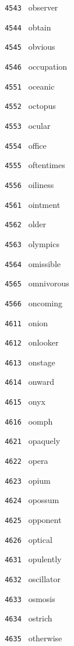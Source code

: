 \documentclass[11pt]{article}
\begin{document}
\begin{multicols}{6}
\noindent \texttt{ 4543 } observer  \par
\noindent \texttt{ 4544 } obtain  \par
\noindent \texttt{ 4545 } obvious  \par
\noindent \texttt{ 4546 } occupation  \par
\noindent \texttt{ 4551 } oceanic  \par
\noindent \texttt{ 4552 } octopus  \par
\noindent \texttt{ 4553 } ocular  \par
\noindent \texttt{ 4554 } office  \par
\noindent \texttt{ 4555 } oftentimes  \par
\noindent \texttt{ 4556 } oiliness  \par
\noindent \texttt{ 4561 } ointment  \par
\noindent \texttt{ 4562 } older  \par
\noindent \texttt{ 4563 } olympics  \par
\noindent \texttt{ 4564 } omissible  \par
\noindent \texttt{ 4565 } omnivorous  \par
\noindent \texttt{ 4566 } oncoming  \par
\noindent \texttt{ 4611 } onion  \par
\noindent \texttt{ 4612 } onlooker  \par
\noindent \texttt{ 4613 } onstage  \par
\noindent \texttt{ 4614 } onward  \par
\noindent \texttt{ 4615 } onyx  \par
\noindent \texttt{ 4616 } oomph  \par
\noindent \texttt{ 4621 } opaquely  \par
\noindent \texttt{ 4622 } opera  \par
\noindent \texttt{ 4623 } opium  \par
\noindent \texttt{ 4624 } opossum  \par
\noindent \texttt{ 4625 } opponent  \par
\noindent \texttt{ 4626 } optical  \par
\noindent \texttt{ 4631 } opulently  \par
\noindent \texttt{ 4632 } oscillator  \par
\noindent \texttt{ 4633 } osmosis  \par
\noindent \texttt{ 4634 } ostrich  \par
\noindent \texttt{ 4635 } otherwise  \par

\end{multicols}
\end{document}
